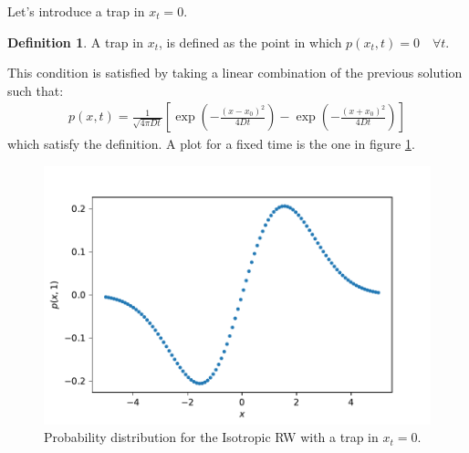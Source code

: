 \documentclass[4apaper,11pt,fleqn]{article}
\theoremstyle{remark}
\theoremstyle{definition}
\newtheorem*{dfn}{Definition}
\begin{document}
Let's introduce a trap in $x_t = 0$.
\begin{dfn}
  A trap in $x_t$, is defined as the point in which $p(x_t,t)=0 \quad \forall t$.
\end{dfn}
This condition is satisfied by taking a linear combination of the previous solution such that:
\begin{align}
  \label{eq:sol_trap}
  p(x, t)=\frac{1}{\sqrt{4 \pi D t}}\left[\exp \left(-\frac{\left(x-x_{0}\right)^{2}}{4 D t}\right)-\exp \left(-\frac{\left(x+x_{0}\right)^{2}}{4 D t}\right)\right]
\end{align}
which satisfy the definition. A plot for a fixed time is the one in figure \ref{fig:rwiso}.
\begin{figure}
  \includegraphics[width=\textwidth]{plot_iso_RW.pdf}
  \caption{Probability distribution for the Isotropic RW with a trap in $x_t=0$.}
  \label{fig:rwiso}
\end{figure}
\end{document}
